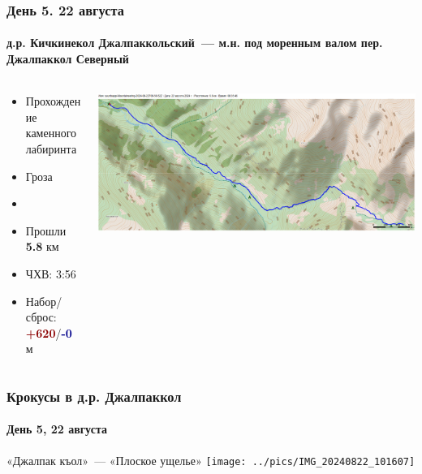 	\begin{frame}
	\frametitle{День 5. 22 августа}
	\framesubtitle{д.р. Кичкинекол Джалпаккольский~--- м.н. под моренным валом пер. Джалпаккол Северный} %
	\begin{columns}[c] %
		\begin{column}{0.45\textwidth} %
			\begin{itemize}
				\item Прохождение каменного лабиринта
				\item Гроза
				\item[]
				\item Прошли \textbf{5.8} км
				\item ЧХВ: 3:56
				\item Набор/сброс: \textcolor{darkred}{\textbf{+620}}/\textcolor{darkblue}{\textbf{-0}}~м
			\end{itemize}
			
		\end{column}
		\begin{column}{0.5\textwidth} %
			\centering
			\includegraphics[width=\linewidth]{../pics/mini_maps/22}
		\end{column}
	\end{columns}
\end{frame}




\begin{frame}
	\frametitle{Крокусы в д.р. Джалпаккол}
	\framesubtitle{День 5, 22 августа}
	\footnotesize«Джалпак къол»~--- «Плоское ущелье»
	\centering
	\texttt{[image: ../pics/IMG\_20240822\_101607]}			
\end{frame}

